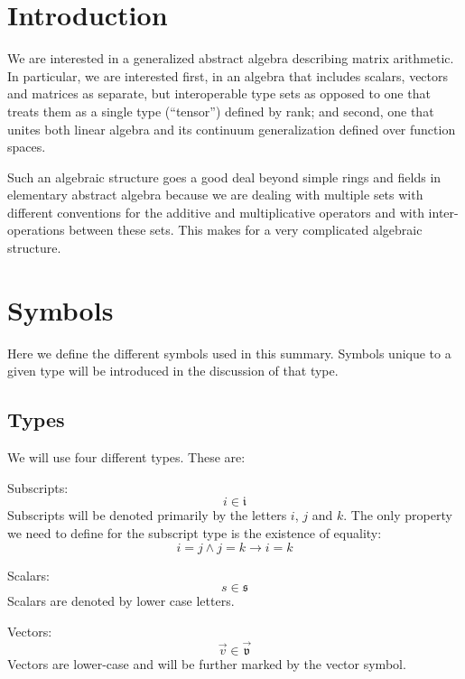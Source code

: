 \documentclass{article}
\newcommand{\subclass}{\mathfrak{i}}
\newcommand{\scalarclass}{\mathfrak{s}}
\newcommand{\vectorclass}{\vec{\mathfrak{v}}}
\begin{document}
\section{Introduction}

We are interested in a generalized abstract algebra describing matrix
arithmetic.
In particular, we are interested first, in an algebra that includes scalars,
vectors and matrices as separate, but interoperable type sets as opposed to one
that treats them as a single type (``tensor'') defined by rank; and second,
one that unites both linear algebra and its continuum generalization
defined over function spaces.

Such an algebraic structure goes a good deal beyond simple rings and fields
in elementary abstract algebra because we are dealing with multiple sets
with different conventions for the additive and multiplicative operators
and with inter-operations between these sets.
This makes for a very complicated algebraic structure.

\section{Symbols}

Here we define the different symbols used in this summary.
Symbols unique to a given type will be introduced in the discussion of that
type.

\subsection{Types}

We will use four different types. These are:

Subscripts:
\begin{equation}
i \in \subclass
\end{equation}
Subscripts will be denoted primarily by the letters $i$, $j$ and $k$.
The only property we need to define for the subscript type is the existence
of equality:
\begin{equation}
	i = j \land j = k \rightarrow i = k
\end{equation}

Scalars:
\begin{equation}
	s \in \scalarclass
\end{equation}
Scalars are denoted by lower case letters.

Vectors:
\begin{equation}
	\vec v \in \vectorclass
	\label{vectormembership}
\end{equation}
Vectors are lower-case and will be further marked by the vector symbol.
\end{document}
